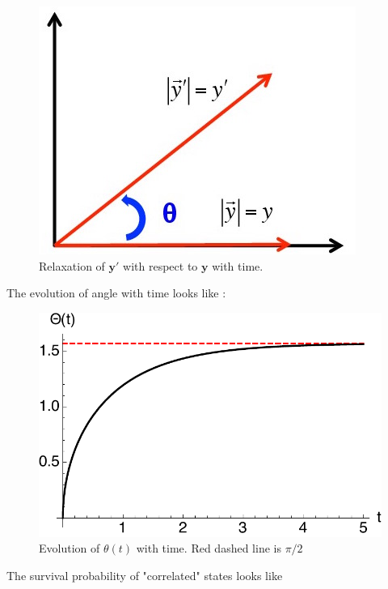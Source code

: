 \documentclass{article}
\begin{document}
\begin{figure}[H]
\begin{center}
 \includegraphics[scale=0.5]{plots/1D_Relaxation.jpg}
\caption{Relaxation of $\mathbf{y}'$ with respect to $\mathbf{y}$ with time.}
\end{center}
\end{figure}
The evolution of angle with time looks like :
\begin{figure}[H]
\begin{center}
 \includegraphics[scale=0.7]{plots/AngleEvolution.pdf}
\caption{Evolution of $\theta(t)$ with time. Red dashed line is $\pi/2$}
\end{center}
\end{figure}
The survival probability of "correlated" states looks like
\end{document}
